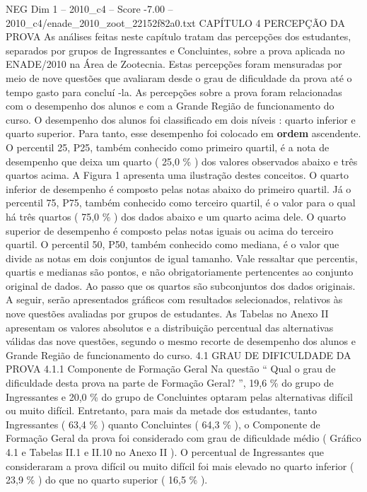 \begin{textsample}{NEG Dim 1 – 2010\_c4 – Score -7.00 – 2010\_c4/enade\_2010\_zoot\_22152f82a0.txt}  \label{ex:f1_neg_031}
CAPÍTULO 4 PERCEPÇÃO DA PROVA As análises feitas neste capítulo tratam das percepções dos estudantes, separados por grupos de Ingressantes e Concluintes, sobre a prova aplicada no ENADE/2010 na Área de Zootecnia.
Estas percepções foram mensuradas por meio de nove questões que avaliaram desde o grau de dificuldade da prova até o tempo gasto para concluí -la.
As percepções sobre a prova foram relacionadas com o desempenho dos alunos e com a Grande Região de funcionamento do curso.
O desempenho dos alunos foi classificado em dois níveis : quarto inferior e quarto superior.
Para tanto, esse desempenho foi colocado em \textbf{ordem} ascendente.
O percentil 25, P25, também conhecido como primeiro quartil, é a nota de desempenho que deixa um quarto ( 25,0 \% ) dos valores observados abaixo e três quartos acima.
A Figura 1 apresenta uma ilustração destes conceitos.
O quarto inferior de desempenho é composto pelas notas abaixo do primeiro quartil.
Já o percentil 75, P75, também conhecido como terceiro quartil, é o valor para o qual há três quartos ( 75,0 \% ) dos dados abaixo e um quarto acima dele.
O quarto superior de desempenho é composto pelas notas iguais ou acima do terceiro quartil.
O percentil 50, P50, também conhecido como mediana, é o valor que divide as notas em dois conjuntos de igual tamanho.
Vale ressaltar que percentis, quartis e medianas são pontos, e não obrigatoriamente pertencentes ao conjunto original de dados.
Ao passo que os quartos são subconjuntos dos dados originais.
A seguir, serão apresentados gráficos com resultados selecionados, relativos às nove questões avaliadas por grupos de estudantes.
As Tabelas no Anexo II apresentam os valores absolutos e a distribuição percentual das alternativas válidas das nove questões, segundo o mesmo recorte de desempenho dos alunos e Grande Região de funcionamento do curso. 4.1 GRAU DE DIFICULDADE DA PROVA 4.1.1 Componente de Formação Geral Na questão “ Qual o grau de dificuldade desta prova na parte de Formação Geral? ”, 19,6 \% do grupo de Ingressantes e 20,0 \% do grupo de Concluintes optaram pelas alternativas difícil ou muito difícil.
Entretanto, para mais da metade dos estudantes, tanto Ingressantes ( 63,4 \% ) quanto Concluintes ( 64,3 \% ), o Componente de Formação Geral da prova foi considerado com grau de dificuldade médio ( Gráfico 4.1 e Tabelas II.1 e II.10 no Anexo II ).
O percentual de Ingressantes que consideraram a prova difícil ou muito difícil foi mais elevado no quarto inferior ( 23,9 \% ) do que no quarto superior ( 16,5 \% ).

\end{textsample}
